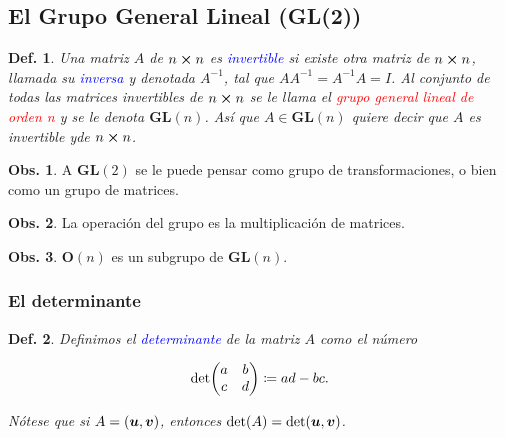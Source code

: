 \documentclass{article}
\theoremstyle{definicion}
\newtheorem{definicion}{Def.}
\theoremstyle{definition}             %
\theoremstyle{definition}             %
\theoremstyle{definition}
\theoremstyle{definition}
\theoremstyle{observacion}
\newtheorem{obs}{Obs.}
\theoremstyle{definition}
\theoremstyle{plain}
\theoremstyle{definition}
\theoremstyle{afirmacion}
\theoremstyle{notation}
\theoremstyle{definition}
\begin{document}
    \subsection{El Grupo General Lineal (GL(2))}

    \begin{definicion}
        Una matriz \(A\) de \(n \cross n\) es \textcolor{blue}{invertible} si existe otra matriz de \(n \cross n\), llamada su \textcolor{blue}{inversa} y denotada \(A^{-1}\), tal que \(A A^{-1} = A^{-1}A = I\). Al conjunto de todas las matrices invertibles de \(n \cross n\) se le llama el \textcolor{red}{grupo general lineal de orden n} y se le denota \(\bm{GL}(n)\). Así que \(A \in \bm{GL}(n)\) quiere decir que \(A\) es invertible yde \(n \cross n\).
    \end{definicion}

    \begin{obs}
        A \(\bm{GL}(2)\) se le puede pensar como grupo de transformaciones, o bien como un grupo de matrices.
    \end{obs}
    \begin{obs}
        La operación del grupo es la multiplicación de matrices.
    \end{obs}
    \begin{obs}
        \(\bm{O}(n)\) es un subgrupo de \(\bm{GL}(n)\).
    \end{obs}

    \subsubsection{El determinante}

    \begin{definicion}
        Definimos el \textcolor{blue}{determinante} de la matriz \(A\) como el número

        \begin{equation*}
            \det(
                \mqty{
                    a & b \\
                    c & d
                }
            ) \coloneq ad - bc.
        \end{equation*}

        Nótese que si \(A = (\vb*{u}, \vb*{v})\), entonces \(\det(A) = \det(\vb*{u}, \vb*{v})\).
    \end{definicion}
\end{document}
